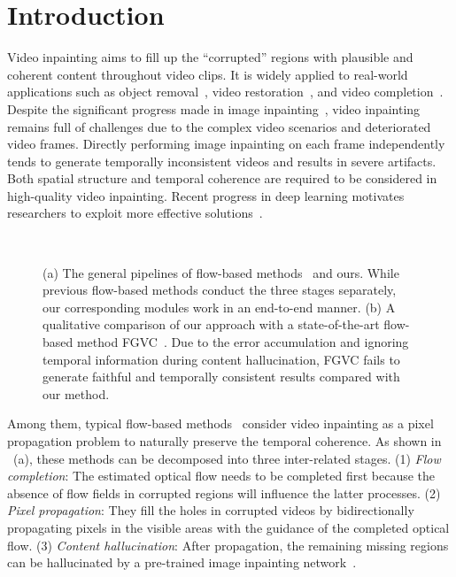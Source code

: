 \documentclass[final]{cvpr}
\begin{document}
\section{Introduction}
Video inpainting aims to fill up the ``corrupted'' regions with plausible and coherent content throughout video clips.
It is widely applied to real-world applications such as object removal~\cite{7112116}, video restoration~\cite{lee2019cpnet}, and video completion~\cite{chang2019free,oh2019onion}.
Despite the significant progress made in image inpainting~\cite{yu2018generative,yu2018free,pathak2016context}, video inpainting remains full of challenges due to the complex video scenarios and deteriorated video frames. 
Directly performing image inpainting on each frame independently tends to generate temporally inconsistent videos and results in severe artifacts.
Both spatial structure and temporal coherence are required to be considered in high-quality video inpainting.
Recent progress in deep learning motivates researchers to exploit more effective solutions~\cite{newson2014video,wang2019video,kim2019deep,chang2019learnable,chang2019free,lee2019cpnet,Xu_2019_CVPR,yan2020sttn,Liu_2021_FuseFormer,Gao-ECCV-FGVC}.

\begin{figure}[t]
    \centering
    \\
    \vspace{-3mm}
    \caption{
        (a) The general pipelines of flow-based methods~\cite{Xu_2019_CVPR,Gao-ECCV-FGVC} and ours.
While previous flow-based methods conduct the three stages separately, our corresponding modules work in an end-to-end manner.
(b) A qualitative comparison of our approach with a state-of-the-art flow-based method FGVC~\cite{Gao-ECCV-FGVC}.
Due to the error accumulation and ignoring temporal information during content hallucination, FGVC fails to generate faithful and temporally consistent results compared with our method.
        }
    \label{fig:intro}
    \vspace{-4mm}
\end{figure}


Among them, typical flow-based methods~\cite{Xu_2019_CVPR,Gao-ECCV-FGVC} consider video inpainting as a pixel propagation problem to naturally preserve the temporal coherence.
As shown in ~(a), these methods can be decomposed into three inter-related stages.
(1) \textit{Flow completion}: The estimated optical flow needs to be completed first because the absence of flow fields in corrupted regions will influence the latter processes.
(2) \textit{Pixel propagation}: They fill the holes in corrupted videos by bidirectionally propagating pixels in the visible areas with the guidance of the completed optical flow.
(3) \textit{Content hallucination}: After propagation, the remaining missing regions can be hallucinated by a pre-trained image inpainting network~\cite{yu2018generative,yu2018free}.
\end{document}
